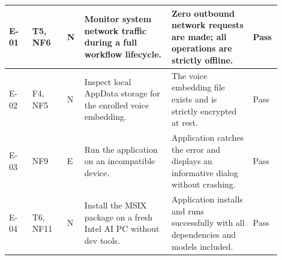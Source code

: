 \begin{longtable}{|p{0.08\linewidth}|p{0.12\linewidth}|p{0.06\linewidth}|p{0.30\linewidth}|p{0.28\linewidth}|p{0.06\linewidth}|}
E-01 & T5, NF6 & N & Monitor system network traffic during a full workflow lifecycle. & Zero outbound network requests are made; all operations are strictly offline. & Pass \\ \hline
E-02 & F4, NF5 & N & Inspect local AppData storage for the enrolled voice embedding. & The voice embedding file exists and is strictly encrypted at rest. & Pass \\ \hline
E-03 & NF9 & E & Run the application on an incompatible device. & Application catches the error and displays an informative dialog without crashing. & Pass \\ \hline
E-04 & T6, NF11 & N & Install the MSIX package on a fresh Intel AI PC without dev tools. & Application installs and runs successfully with all dependencies and models included. & Pass \\ \hline

\end{longtable}